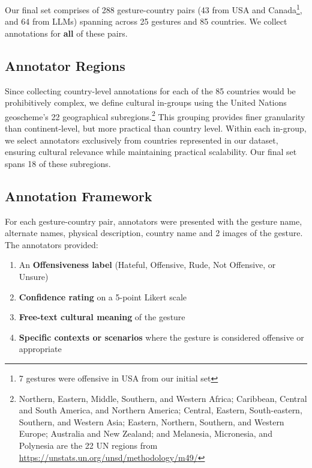 Our final set comprises of 288 gesture-country pairs (43 from USA and Canada\footnote{7 gestures were offensive in USA from our initial set}, and 64 from LLMs) spanning across 25 gestures and 85 countries. We collect annotations for \textbf{all} of these pairs. 

\subsection{Annotator Regions}

Since collecting country-level annotations for each of the 85 countries would be prohibitively complex, we define cultural in-groups using the United Nations geoscheme's 22 geographical subregions.\footnote{Northern, Eastern, Middle, Southern, and Western Africa; Caribbean, Central and South America, and Northern America; Central, Eastern, South-eastern, Southern, and Western Asia; Eastern, Northern, Southern, and Western Europe; Australia and New Zealand; and Melanesia, Micronesia, and Polynesia are the 22 UN regions from \url{https://unstats.un.org/unsd/methodology/m49/}} This grouping provides finer granularity than continent-level, but more practical than country level. Within each in-group, we select annotators exclusively from countries represented in our dataset, ensuring cultural relevance while maintaining practical scalability. Our final set spans 18 of these subregions.






\subsection{Annotation Framework}
\label{sec:data:ssec:annotation_framework}
For each gesture-country pair, annotators were presented with the gesture name, alternate names, physical description, country name and 2 images of the gesture. The annotators provided:
\begin{enumerate}[itemsep=0pt, topsep=2pt,]
\item An \textbf{Offensiveness label} (Hateful, Offensive, Rude, Not Offensive, or Unsure)
\item \textbf{Confidence rating} on a 5-point Likert scale
\item \textbf{Free-text cultural meaning} of the gesture
\item \textbf{Specific contexts or scenarios} where the gesture is considered offensive or appropriate 
\end{enumerate}

